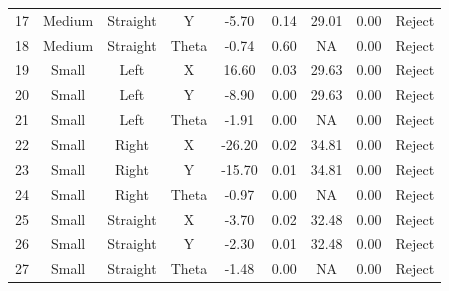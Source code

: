 \begin{table}[t!]
\begin{tabular}{|c|c|c|c|c|c|c|c|c|}
17 & Medium & Straight & Y & -5.70 & 0.14 & 29.01 & 0.00 & Reject \\
18 & Medium & Straight & Theta & -0.74 & 0.60 & NA & 0.00 & Reject \\
19 & Small & Left & X & 16.60 & 0.03 & 29.63 & 0.00 & Reject \\
20 & Small & Left & Y & -8.90 & 0.00 & 29.63 & 0.00 & Reject \\
21 & Small & Left & Theta & -1.91 & 0.00 & NA & 0.00 & Reject \\
22 & Small & Right & X & -26.20 & 0.02 & 34.81 & 0.00 & Reject \\
23 & Small & Right & Y & -15.70 & 0.01 & 34.81 & 0.00 & Reject \\
24 & Small & Right & Theta & -0.97 & 0.00 & NA & 0.00 & Reject \\
25 & Small & Straight & X & -3.70 & 0.02 & 32.48 & 0.00 & Reject \\
26 & Small & Straight & Y & -2.30 & 0.01 & 32.48 & 0.00 & Reject \\
27 & Small & Straight & Theta & -1.48 & 0.00 & NA & 0.00 & Reject \\ \hline
\end{tabular}
\end{table}
